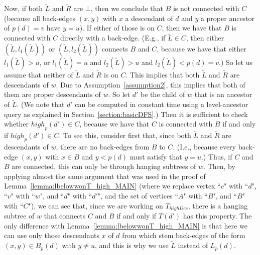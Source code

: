 \documentclass[11pt,a4paper]{article}
\begin{document}
Now, if both $\widetilde{L}$ and $\widetilde{R}$ are $\bot$, then we conclude that $B$ is not connected with $C$ (because all back-edges $(x,y)$ with $x$ a descendant of $d$ and $y$ a proper ancestor of $p(d)=v$ have $y=u$). If either of those is on $C$, then we have that $B$ is connected with $C$ directly with a back-edge. (E.g., if $\widetilde{L}\in C$, then either $(\widetilde{L},l_1(\widetilde{L}))$ or $(\widetilde{L},l_2(\widetilde{L}))$ connects $B$ and $C$, because we have that either $l_1(\widetilde{L})>u$, or $l_1(\widetilde{L})=u$ and $l_2(\widetilde{L})>u$ and $l_2(\widetilde{L})<p(d)=v$.) So let us assume that neither of $\widetilde{L}$ and $\widetilde{R}$ is on $C$. This implies that both $\widetilde{L}$ and $\widetilde{R}$ are descendants of $w$. Due to Assumption~\ref{assumption2}, this implies that both of them are proper descendants of $w$. So let $d'$ be the child of $w$ that is an ancestor of $\widetilde{L}$. (We note that $d'$ can be computed in constant time using a level-ancestor query as explained in Section~\ref{section:basicDFS}.) Then it is sufficient to check whether $\mathit{high}_p(d')\in C$, because we have that $C$ is connected with $B$ if and only if $\mathit{high}_p(d')\in C$. To see this, consider first that, since both $\widetilde{L}$ and $\widetilde{R}$ are descendants of $w$, there are no back-edges from $B$ to $C$. (I.e., because every back-edge $(x,y)$ with $x\in B$ and $y<p(d)$ must satisfy that $y=u$.) Thus, if $C$ and $B$ are connected, this can only be through hanging subtrees of $w$. Then, by applying almost the same argument that was used in the proof of Lemma~\ref{lemma:lbelowwonT_high_MAIN} (where we replace vertex ``$c$" with ``$d$", ``$v$" with ``$w$", and ``$d$" with ``$d'$", and the set of vertices ``$A$" with ``$B$", and ``$B$" with ``$C$"), we can see that, since we are working on $T_\mathit{highDec}$, there is a hanging subtree of $w$ that connects $C$ and $B$ if and only if $T(d')$ has this property. The only difference with Lemma~\ref{lemma:lbelowwonT_high_MAIN} is that here we can use only those descendants $x$ of $d$ from which stem back-edges of the form $(x,y)\in B_p(d)$ with $y\neq u$, and this is why we use $\widetilde{L}$ instead of $L_p(d)$.
\end{document}
